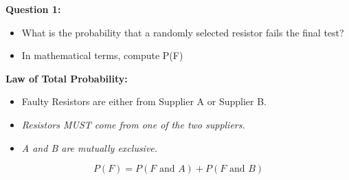 \documentclass[]{report}
\begin{document}
\textbf{Question 1:}
\begin{itemize}
	\item What is the probability that a randomly selected resistor fails the final test?
	
	\item In mathematical terms, compute P(F) 
\end{itemize}


\textbf{Law of Total Probability:}
\begin{itemize}
	\item Faulty Resistors are either from Supplier A or Supplier B.
	\vspace{0.3cm} 
	\item \textit{Resistors MUST come from one of the two suppliers.}
	\item \textit{A and B are mutually exclusive.}
\end{itemize}
\vspace{0.3cm} 
\[ P(F) = P(F \mbox{ and } A) + P(F \mbox{ and } B) \]
\end{document}
